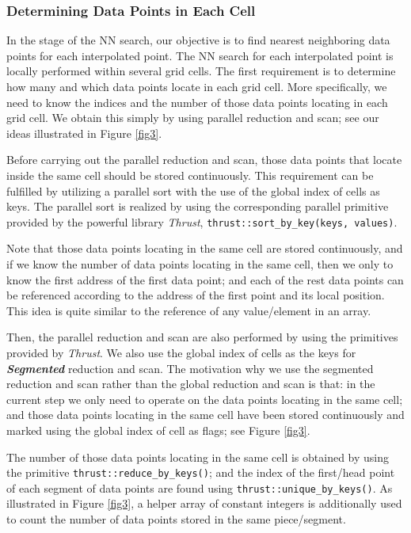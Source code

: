 \documentclass[final,5p,times,twocolumn,authoryear]{elsarticle}
\begin{document}
			\subsubsection{Determining Data Points in Each Cell}
			
			In the stage of the NN search, our objective is to find  nearest neighboring 
			data points for each interpolated point. The NN search for each interpolated 
			point is locally performed within several grid cells. The first requirement 
			is to determine how many and which data points locate in each grid cell. 
			More specifically, we need to know the indices and the number of those data 
			points locating in each grid cell. We obtain this simply by using parallel 
			reduction and scan; see our ideas illustrated in Figure \ref{fig3}.
			
			Before carrying out the parallel reduction and scan, those data points that 
			locate inside the same cell should be stored continuously. This requirement 
			can be fulfilled by utilizing a parallel sort with the use of the global index 
			of cells as keys. The parallel sort is realized by using the corresponding 
			parallel primitive provided by the powerful library \textit{Thrust}, 
			\texttt{thrust::sort{\_}by{\_}key(keys, values)}.
			
			Note that those data points locating in the same cell are stored 
			continuously, and if we know the number of data points locating in the same 
			cell, then we only to know the first address of the first data point; and 
			each of the rest data points can be referenced according to the address of 
			the first point and its local position. This idea is quite similar to the 
			reference of any value/element in an array. 
			
			Then, the parallel reduction and scan are also performed by using the 
			primitives provided by \textit{Thrust}. We also use the global index of cells as the keys 
			for \textbf{\textit{Segmented}} reduction and scan. The motivation why we 
			use the segmented reduction and scan rather than the global reduction and 
			scan is that: in the current step we only need to operate on the data points 
			locating in the same cell; and those data points locating in the same cell 
			have been stored continuously and marked using the global index of cell as 
			flags; see Figure \ref{fig3}.
			
			The number of those data points locating in the same cell is obtained by 
			using the primitive \texttt{thrust::reduce{\_}by{\_}keys()}; and the index of the 
			first/head point of each segment of data points are found using 
			\texttt{thrust::unique{\_}by{\_}keys()}. As illustrated in Figure \ref{fig3}, a helper array 
			of constant integers is additionally used to count the number of data points 
			stored in the same piece/segment. 
			
\end{document}

